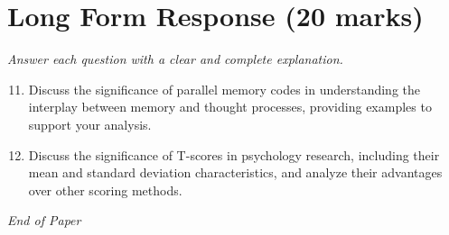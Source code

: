 \documentclass[12pt]{article}
\begin{document}
\section*{Long Form Response (20 marks)}
\textit{Answer each question with a clear and complete explanation.}
\begin{enumerate}[label=\arabic*.]
\setcounter{enumi}{10}
\item Discuss the significance of parallel memory codes in understanding the interplay between memory and thought processes, providing examples to support your analysis.
\item Discuss the significance of T-scores in psychology research, including their mean and standard deviation characteristics, and analyze their advantages over other scoring methods.
\end{enumerate}

\vfill
\noindent\textit{End of Paper}
\end{document}
